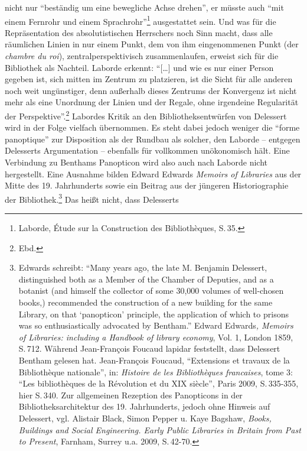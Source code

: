 nicht nur \enquote{beständig um eine bewegliche Achse drehen}, er müsste
auch \enquote{mit einem Fernrohr und einem Sprachrohr}\footnote{Laborde,
  Étude sur la Construction des Bibliothèques, S.\,35.} ausgestattet
sein. Und was für die Repräsentation des absolutistischen Herrschers
noch Sinn macht, dass alle räumlichen Linien in nur einem Punkt, dem von
ihm eingenommenen Punkt (der \emph{chambre du roi}),
zentralperspektivisch zusammenlaufen, erweist sich für die Bibliothek
als Nachteil. Laborde erkennt: \enquote{{[}\ldots{}{]} und wie es nur
einer Person gegeben ist, sich mitten im Zentrum zu platzieren, ist die
Sicht für alle anderen noch weit ungünstiger, denn außerhalb dieses
Zentrums der Konvergenz ist nicht mehr als eine Unordnung der Linien und
der Regale, ohne irgendeine Regularität der Perspektive}.\footnote{Ebd.}
Labordes Kritik an den Bibliotheksentwürfen von Delessert wird in der
Folge vielfach übernommen. Es steht dabei jedoch weniger die
\enquote{forme panoptique} zur Disposition als der Rundbau als solcher,
den Laborde -- entgegen Delesserts Argumentation -- ebenfalls für
vollkommen unökonomisch hält. Eine Verbindung zu Benthams Panopticon
wird also auch nach Laborde nicht hergestellt. Eine Ausnahme bilden
Edward Edwards \emph{Memoirs of Libraries} aus der Mitte des 19.
Jahrhunderts sowie ein Beitrag aus der jüngeren Historiographie der
Bibliothek.\footnote{Edwards schreibt: \enquote{Many years ago, the late
  M. Benjamin Delessert, distinguished both as a Member of the Chamber
  of Deputies, and as a botanist (and himself the collector of some
  30,000 volumes of well-chosen books,) recommended the construction of
  a new building for the same Library, on that \enquote{panopticon}
  principle, the application of which to prisons was so enthusiastically
  advocated by Bentham.} Edward Edwards\emph{, Memoirs of Libraries:
  including a Handbook of library economy}, Vol. 1, London 1859, S.\,712.
  Während Jean-François Foucaud lapidar feststellt, dass Delessert
  Bentham gelesen hat. Jean-François Foucaud, \enquote{Extensions et
  travaux de la Bibliothèque nationale}, in: \emph{Histoire de les
  Bibliothèques francaises}, tome 3: \enquote{Les bibliothèques de la
  Révolution et du XIX siècle}, Paris 2009, S.\,335-355, hier S.\,340. Zur
  allgemeinen Rezeption des Panopticons in der Bibliotheksarchitektur
  des 19. Jahrhunderts, jedoch ohne Hinweis auf Delessert, vgl. Alistair
  Black, Simon Pepper u. Kaye Bagshaw, \emph{Books, Buildings and Social
  Engineering. Early Public Libraries in Britain from Past to Present},
  Farnham, Surrey u.a. 2009, S.\,42-70.} Das heißt nicht, dass Delesserts
